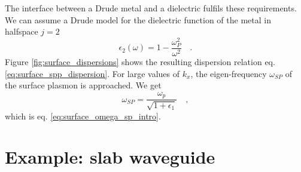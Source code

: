 The interface between a Drude metal and a dielectric fulfils these requirements. We can assume a Drude model for the dielectric function of the metal in halfspace $j=2$
\begin{equation}
\epsilon_2(\omega) = 1 - \frac{\omega_P^2}{\omega^2} \quad .
\end{equation}
Figure \ref{fig:surface_dispersions}
 shows the resulting dispersion relation eq. \ref{eq:surface_spp_dispersion}. For large values of $k_x$, the eigen-frequency $\omega_{SP}$ of the surface plasmon is approached.  We get
\begin{equation}
\omega_{SP} = \frac{\omega_p}{\sqrt{1 + \epsilon_1}} \quad ,
\end{equation}
which is eq. \ref{eq:surface_omega_sp_intro}.


\section{Example: slab waveguide}

